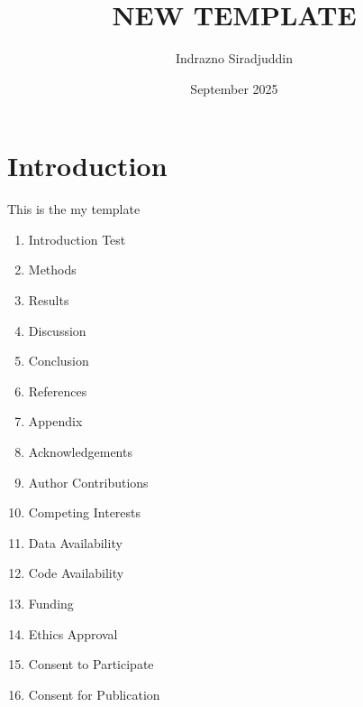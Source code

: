 \documentclass[12pt]{article}
\title{NEW TEMPLATE}
\author{Indrazno Siradjuddin}
\date{September 2025}
\begin{document}
\maketitle

\section{Introduction}
This is the my template
\begin{enumerate}
    \item Introduction Test
    \item Methods
    \item Results
    \item Discussion
    \item Conclusion
    \item   References
    \item Appendix
    \item Acknowledgements
    \item Author Contributions
    \item Competing Interests
    \item Data Availability
    \item Code Availability
    \item Funding
    \item Ethics Approval
    \item Consent to Participate
    \item Consent for Publication
\end{enumerate}
\end{document}
